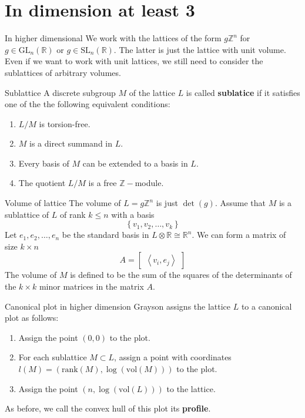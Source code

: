 \documentclass[pdf]{beamer}
\begin{document}
\section{In dimension at least 3}
\begin{frame}{In higher dimensional}
    We work with the lattices of the form $g\mathbb{Z}^n$ for $g \in \text{GL}_n(\mathbb{R})$ or
    $g \in \text{SL}_n(\mathbb{R})$. The latter is just the lattice with unit volume. Even if we want to work with unit lattices,
    we still need to consider the sublattices of arbitrary volumes.
    \pause
    \begin{block}{Sublattice}
        A discrete subgroup $M$ of the lattice $L$ is called \textbf{sublatice} if it satisfies one of the
        the following equivalent conditions:
        \begin{enumerate}
            \item $L/M$ is torsion-free.
            \item $M$ is a direct summand in $L$.
            \item Every basis of $M$ can be extended to a basis in $L$.
            \item The quotient $L/M$ is a free $\mathbb{Z}-$module.
        \end{enumerate}
    \end{block}
\end{frame}
\begin{frame}{Volume of lattice}
    The volume of $L = g\mathbb{Z}^n$ is just $\det(g)$. Assume that $M$ is a sublattice of $L$ of rank $k \le n$
    with a basis
    \[\left\lbrace v_1, v_2,\ldots, v_k\right\rbrace\]
    Let $e_1,e_2,\ldots,e_n$ be the standard basis in $L \otimes \mathbb{R} \cong \mathbb{R}^n$. We can form a matrix of size $k \times n$
    \[A = \begin{bmatrix}
            \left\langle v_i ,e_j\right\rangle
        \end{bmatrix}\]
    The volume of $M$ is defined to be the sum of the squares of the determinants of the $k \times k$ minor matrices in the matrix $A$.
\end{frame}
\begin{frame}{Canonical plot in higher dimension}
    Grayson assigns the lattice $L$ to a canonical plot as follows:
    \begin{enumerate}
        \item Assign the point $(0,0)$ to the plot.
        \item For each sublattice $M \subset L$, assign a point with coordinates ${l}(M) = (\text{rank}(M), \log(\text{vol}(M)))$ to the plot.
        \item Assign the point $(n, \log(\text{vol}(L)))$ to the lattice.
    \end{enumerate} \pause

    As before, we call the convex hull of this plot its \textbf{profile}.
\end{frame}
\end{document}

